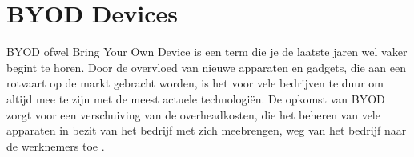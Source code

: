 \section{BYOD Devices}

BYOD ofwel Bring Your Own Device is een term die je de laatste jaren wel vaker begint te horen. Door de overvloed van nieuwe apparaten en gadgets, die aan een rotvaart op de markt gebracht worden, is het voor vele bedrijven te duur om altijd mee te zijn met de meest actuele technologiën. De opkomst van BYOD zorgt voor een verschuiving van de overheadkosten, die het beheren van vele apparaten in bezit van het bedrijf met zich meebrengen, weg van het bedrijf naar de werknemers toe \autocite{Hong2016}.





